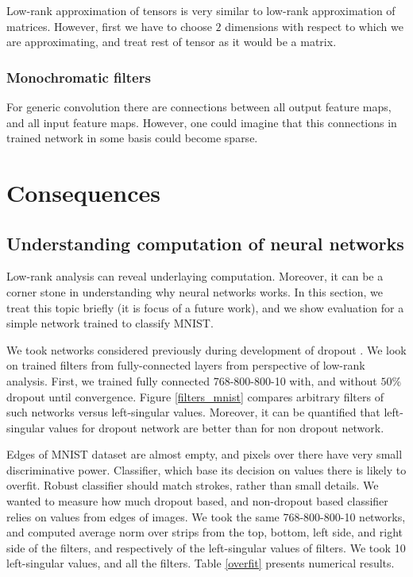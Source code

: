 \documentclass{article}
\begin{document}
Low-rank approximation of tensors is very similar to low-rank approximation of matrices.
However, first we have to choose $2$ dimensions with respect to which we are approximating, and treat
rest of tensor as it would be a matrix. 

\subsubsection{Monochromatic filters}
For generic convolution there are connections between all output feature maps, and all input feature maps.
However, one could imagine that this connections in trained network in some basis could become sparse. 

\section{Consequences}

\subsection{Understanding computation of neural networks}
Low-rank analysis can reveal underlaying computation. Moreover, it can be a corner stone
in understanding why neural networks works. In this section, we treat this topic briefly 
(it is focus of a future work), and we show evaluation for a simple network trained to classify MNIST.


We took networks considered previously during development of dropout \cite{hinton2012improving}.
We look on trained filters from fully-connected layers from perspective of low-rank analysis.
First, we trained fully connected 768-800-800-10 with, and without $50\%$ dropout until convergence.
Figure \ref{filters_mnist} compares arbitrary filters of such networks versus left-singular values. 
Moreover, it can be quantified that left-singular values for dropout network are better than for non dropout network. 


Edges of MNIST dataset are almost empty, and pixels over there have very small discriminative power. 
Classifier, which base its decision on values there is likely to overfit. Robust classifier should
match strokes, rather than small details. We wanted to measure how much
dropout based, and non-dropout based classifier relies on values from edges of images.
We took the same 768-800-800-10 networks, and computed average norm over strips from
the top, bottom, left side, and right side of the filters, and respectively of the left-singular values of filters. 
We took 10 left-singular values, and all the filters. Table \ref{overfit} presents numerical results.
\end{document}
